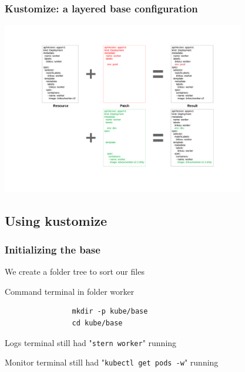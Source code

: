 	\begin{frame}
		\frametitle{Kustomize: a layered base configuration}
		
		\begin{center}
		\includegraphics[height=7.5cm]{../../../resources/color/layeredConfiguration.pdf}
		\end{center}
	\end{frame}

\subsection{Using kustomize}	
	\begin{frame}[fragile]
		\frametitle{Initializing the base}
		
		We create a folder tree to sort our files
		\begin{block}{Command terminal in folder worker}
			\begin{verbatim}
				mkdir -p kube/base
				cd kube/base
			\end{verbatim}
		\end{block}
		
		\bigskip
		
		\begin{footnotesize}
			Logs terminal still had "\verb!stern worker!" running
			
			Monitor terminal still had "\verb!kubectl get pods -w!" running
		\end{footnotesize}
	\end{frame}
	
